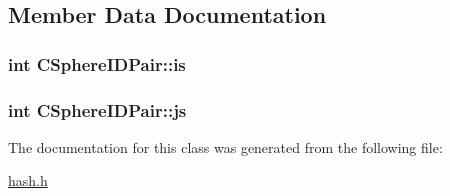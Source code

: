 \subsection{Member Data Documentation}
\hypertarget{classCSphereIDPair_a3754efa63dc9c95877674e9726969692}{
\subsubsection[{is}]{\setlength{\rightskip}{0pt plus 5cm}int C\-Sphere\-I\-D\-Pair\-::is}}\label{classCSphereIDPair_a3754efa63dc9c95877674e9726969692}
\hypertarget{classCSphereIDPair_a14b6e764c660755f6ecc351a806907a7}{
\subsubsection[{js}]{\setlength{\rightskip}{0pt plus 5cm}int C\-Sphere\-I\-D\-Pair\-::js}}\label{classCSphereIDPair_a14b6e764c660755f6ecc351a806907a7}


The documentation for this class was generated from the following file\-:\begin{DoxyCompactItemize}
\item 
\hyperlink{hash_8h}{hash.\-h}\end{DoxyCompactItemize}
